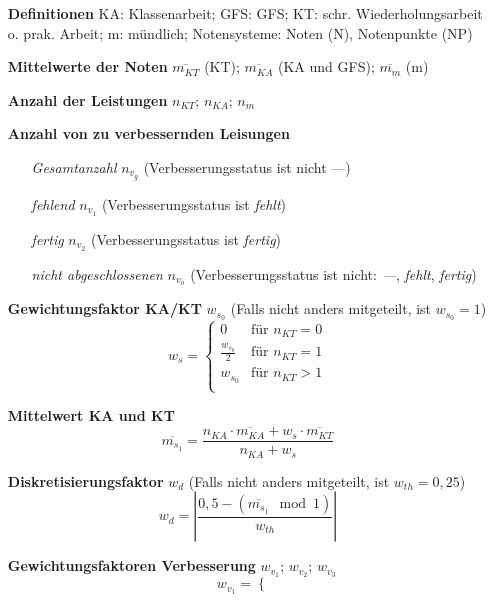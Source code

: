 \documentclass{article}
\begin{document}
\begin{enumerate}[label=\textbf{\textbullet}, align=left, leftmargin=*]
	\item[\textbf{Definitionen}] KA: Klassenarbeit; GFS: GFS; KT: schr. Wiederholungsarbeit o. prak. Arbeit; m: mündlich; Notensysteme: Noten (N), Notenpunkte (NP)
	\item[\textbf{Mittelwerte der Noten}] $\overline{m_{KT}}$ (KT); $\overline{m_{KA}}$ (KA und GFS); $\overline{m_{m}}$ (m)
	\item[\textbf{Anzahl der Leistungen}] $n_{KT}$; $n_{KA}$; $n_{m}$
	\item[\textbf{Anzahl von zu verbessernden Leisungen}] \mbox{} \
	\begin{enumerate}[label=\textbf{\textbullet}, align=left, leftmargin=*]
		\item[\textit{Gesamtanzahl}] $n_{v_g}$ (Verbesserungsstatus ist nicht \glqq ---\grqq{})
		\item[\textit{fehlend}] $n_{v_1}$ (Verbesserungsstatus ist \glqq \textit{fehlt}\grqq{})
		\item[\textit{fertig}] $n_{v_2}$ (Verbesserungsstatus ist \glqq \textit{fertig}\grqq{})
		\item[\textit{nicht abgeschlossenen}] $n_{v_o}$ (Verbesserungsstatus ist nicht: \glqq\textit{---}\grqq{}, \glqq\textit{fehlt}\grqq{}, \glqq\textit{fertig}\grqq{})
	\end{enumerate}
	\item[\textbf{Gewichtungsfaktor KA/KT}] $w_{s_0}$ (Falls nicht anders mitgeteilt, ist $w_{s_0}=1$)
	\[
	w_s =
	\begin{cases}
		0 & \text{für }  n_{KT} = 0 \\
		\frac{w_{s_0}}{2} & \text{für }    n_{KT} = 1 \\
		w_{s_0} & \text{für }    n_{KT} > 1 \\
	\end{cases}
	\]	
	\item[\textbf{Mittelwert KA und KT}] 
	\[
	\overline{m_{s_1}} = \frac{ n_{KA} \cdot \overline{m_{KA}} + w_s \cdot \overline{m_{KT}} }{n_{KA} + w_s}
	\]
	\item[\textbf{Diskretisierungsfaktor}] $w_{d}$ (Falls nicht anders mitgeteilt, ist $w_{th}=0{,}25$)
	\[
	w_{d} = \left| \frac{0{,}5 - (\overline{m_{s_1}} \mod 1)}{w_{th}} \right|
	\]
	\item[\textbf{Gewichtungsfaktoren Verbesserung}] $w_{v_1}$; $w_{v_2}$; $w_{v_3}$ \\
	\[
	w_{v_1} =
	\begin{cases}

\end{cases}\]
\end{enumerate}
\end{document}
